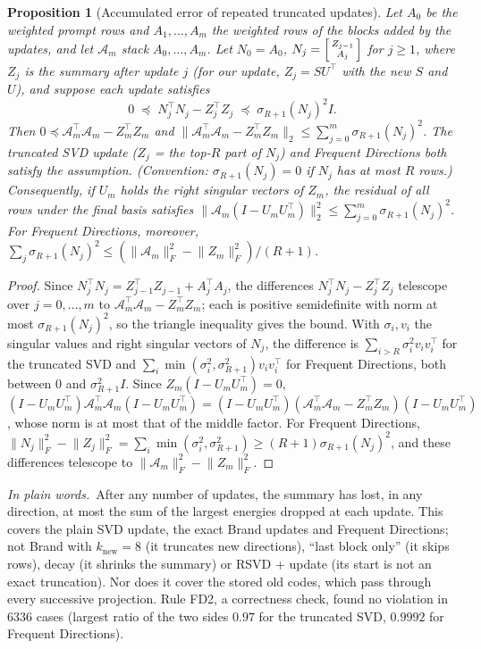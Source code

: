 \documentclass[10pt]{article}
\theoremstyle{plain}
\newtheorem{proposition}[theorem]{Proposition}
\theoremstyle{definition}
\theoremstyle{remark}
\newcommand{\T}{^{\top}}
\newcommand{\opn}[1]{\lVert #1\rVert_2}
\newcommand{\fro}[1]{\lVert #1\rVert_F}
\newcommand{\plain}{\noindent\emph{In plain words.}\ }
\newcommand{\rl}[1]{\textsf{#1}}%
\begin{document}
\begin{proposition}[Accumulated error of repeated truncated updates]\label{prop:accum}
Let $A_0$ be the weighted prompt rows and $A_1,\dots,A_m$ the weighted rows of the blocks added by the updates, and let $\mathcal A_m$ stack $A_0,\dots,A_m$. Let $N_0=A_0$, $N_j=\begin{bsmallmatrix}Z_{j-1}\\ A_j\end{bsmallmatrix}$ for $j\ge1$, where $Z_j$ is the summary after update $j$ (for our update, $Z_j=SU\T$ with the new $S$ and $U$), and suppose each update satisfies
\[
0\;\preceq\;N_j\T N_j-Z_j\T Z_j\;\preceq\;\sigma_{R+1}(N_j)^2I .
\]
Then $0\preceq\mathcal A_m\T\mathcal A_m-Z_m\T Z_m$ and $\opn{\mathcal A_m\T\mathcal A_m-Z_m\T Z_m}\le\sum_{j=0}^m\sigma_{R+1}(N_j)^2$. The truncated SVD update ($Z_j$ = the top-$R$ part of $N_j$) and Frequent Directions both satisfy the assumption. (Convention: $\sigma_{R+1}(N_j)=0$ if $N_j$ has at most $R$ rows.) Consequently, if $U_m$ holds the right singular vectors of $Z_m$, the residual of all rows under the final basis satisfies $\opn{\mathcal A_m(I-U_mU_m\T)}^2\le\sum_{j=0}^m\sigma_{R+1}(N_j)^2$. For Frequent Directions, moreover, $\sum_j\sigma_{R+1}(N_j)^2\le(\fro{\mathcal A_m}^2-\fro{Z_m}^2)/(R+1)$.
\end{proposition}
\begin{proof}
Since $N_j\T N_j=Z_{j-1}\T Z_{j-1}+A_j\T A_j$, the differences $N_j\T N_j-Z_j\T Z_j$ telescope over $j=0,\dots,m$ to $\mathcal A_m\T\mathcal A_m-Z_m\T Z_m$; each is positive semidefinite with norm at most $\sigma_{R+1}(N_j)^2$, so the triangle inequality gives the bound. With $\sigma_i,v_i$ the singular values and right singular vectors of $N_j$, the difference is $\sum_{i>R}\sigma_i^2v_iv_i\T$ for the truncated SVD and $\sum_i\min(\sigma_i^2,\sigma_{R+1}^2)v_iv_i\T$ for Frequent Directions, both between $0$ and $\sigma_{R+1}^2I$. Since $Z_m(I-U_mU_m\T)=0$, $(I-U_mU_m\T)\mathcal A_m\T\mathcal A_m(I-U_mU_m\T)=(I-U_mU_m\T)(\mathcal A_m\T\mathcal A_m-Z_m\T Z_m)(I-U_mU_m\T)$, whose norm is at most that of the middle factor. For Frequent Directions, $\fro{N_j}^2-\fro{Z_j}^2=\sum_i\min(\sigma_i^2,\sigma_{R+1}^2)\ge(R+1)\sigma_{R+1}(N_j)^2$, and these differences telescope to $\fro{\mathcal A_m}^2-\fro{Z_m}^2$.
\end{proof}

\plain After any number of updates, the summary has lost, in any direction, at most the sum of the largest energies dropped at each update. This covers the plain SVD update, the exact Brand updates and Frequent Directions; not Brand with $k_{\mathrm{new}}=8$ (it truncates new directions), ``last block only'' (it skips rows), decay (it shrinks the summary) or RSVD + update (its start is not an exact truncation). Nor does it cover the stored old codes, which pass through every successive projection. Rule \rl{FD2}, a correctness check, found no violation in 6336 cases (largest ratio of the two sides $0.97$ for the truncated SVD, $0.9992$ for Frequent Directions).
\end{document}
